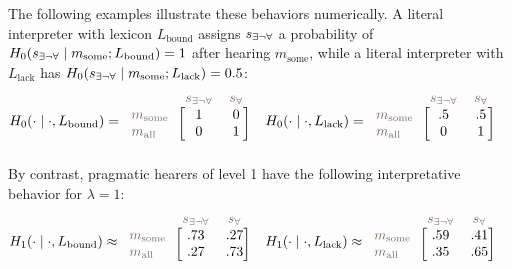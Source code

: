 \documentclass[a4paper, 11pt]{article}
\theoremstyle{Satz}
\newcommand{\state}{\ensuremath{s}\xspace}		%
\newcommand{\mystate}[1]{\ensuremath{\state_{\text{#1}}}\xspace} %
\newcommand{\mylang}[1]{\ensuremath{L_{\text{#1}}}\xspace} %
\newcommand{\messg}{\ensuremath{m}\xspace}		%
\newcommand{\mymessg}[1]{\ensuremath{\messg_{\text{#1}}}\xspace} %
\newcommand{\ssome}{\mystate{\ensuremath{\exists\neg\forall}}}
\newcommand{\sall}{\mystate{\ensuremath{\forall}}}
\newcommand{\msome}{\mymessg{some}}
\newcommand{\mall}{\mymessg{all}}
\newcommand{\Lbound}{\mylang{bound}}
\newcommand{\Llack}{\mylang{lack}}
\newcommand{\mygray}[1]{{\textcolor{mygray}{#1}}}
\begin{document}
The following examples illustrate these behaviors numerically. A literal interpreter with lexicon $\Lbound$ assigns $\ssome$
a probability of $H_0(\ssome \mid \msome; \Lbound) = 1$ after hearing $\msome$, while a literal
interpreter with $\Llack$ has $H_0(\ssome \mid \msome; \Llack) = 0.5$:
\begin{align*}
  H_0(\cdot \mid \cdot, \Lbound) & = \begin{blockarray}{lcc}
    & \mygray{\ssome} & \mygray{\sall} \\
    \begin{block}{l[cc]}
      \mygray{\msome} & 1 & 0 \\
      \mygray{\mall}  & 0 & 1 \\
    \end{block}
  \end{blockarray} &
  H_0(\cdot \mid \cdot, \Llack) & = \begin{blockarray}{lcc}
    & \mygray{\ssome} & \mygray{\sall} \\
    \begin{block}{l[cc]}
      \mygray{\msome} & .5 & .5 \\
      \mygray{\mall}  & 0 & 1 \\
    \end{block}
  \end{blockarray} 
\end{align*}
By contrast, pragmatic hearers of level 1 have the following interpretative behavior for $\lambda = 1$:
\begin{align*}
  H_1(\cdot \mid \cdot, \Lbound) & \approx \begin{blockarray}{lcc}
    & \mygray{\ssome} & \mygray{\sall} \\
    \begin{block}{l[cc]}
      \mygray{\msome} & .73 & .27 \\
      \mygray{\mall}  & .27 & .73 \\
    \end{block}
  \end{blockarray} &
  H_1(\cdot \mid \cdot, \Llack) & \approx \begin{blockarray}{lcc}
    & \mygray{\ssome} & \mygray{\sall} \\
    \begin{block}{l[cc]}
      \mygray{\msome} & .59 & .41 \\
      \mygray{\mall}  & .35 & .65 \\
    \end{block}
  \end{blockarray} 
\end{align*}
\end{document}
